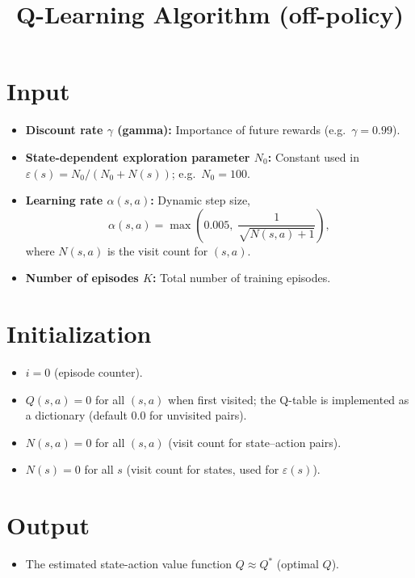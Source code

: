 \documentclass[11pt,a4paper]{article}
\title{Q-Learning Algorithm (off-policy)}
\author{}
\date{}
\begin{document}
\maketitle

\section*{Input}

\begin{itemize}[noitemsep]
  \item \textbf{Discount rate $\gamma$ (gamma):} Importance of future rewards (e.g.\ $\gamma = 0.99$).
  \item \textbf{State-dependent exploration parameter $N_0$:} Constant used in $\varepsilon(s) = N_0 / (N_0 + N(s))$; e.g.\ $N_0 = 100$.
  \item \textbf{Learning rate $\alpha(s,a)$:} Dynamic step size,
  \[
  \alpha(s,a) = \max\left(0.005,\; \frac{1}{\sqrt{N(s,a) + 1}}\right),
  \]
  where $N(s,a)$ is the visit count for $(s,a)$.
  \item \textbf{Number of episodes $K$:} Total number of training episodes.
\end{itemize}

\section*{Initialization}

\begin{itemize}[noitemsep]
  \item $i = 0$ (episode counter).
  \item $Q(s,a) = 0$ for all $(s,a)$ when first visited; the Q-table is implemented as a dictionary (default 0.0 for unvisited pairs).
  \item $N(s,a) = 0$ for all $(s,a)$ (visit count for state--action pairs).
  \item $N(s) = 0$ for all $s$ (visit count for states, used for $\varepsilon(s)$).
\end{itemize}

\section*{Output}

\begin{itemize}[noitemsep]
  \item The estimated state-action value function $Q \approx Q^*$ (optimal $Q$).
\end{itemize}
\end{document}

